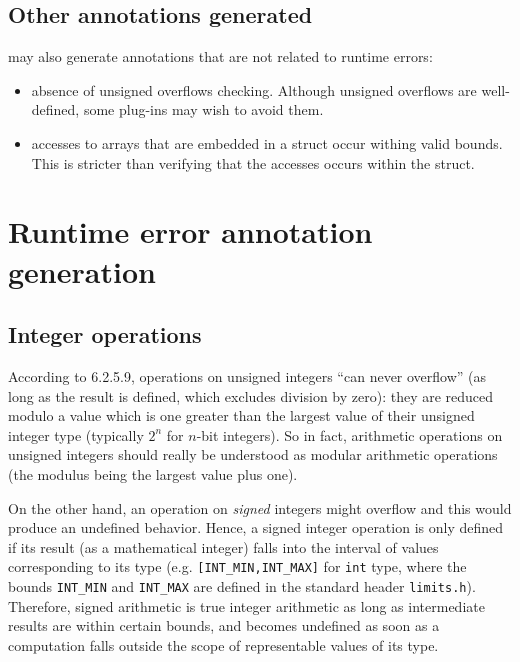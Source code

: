 \section{Other annotations generated}

\rte{} may also generate annotations that are not related to runtime errors:

\begin{itemize}

\item absence of unsigned overflows checking. Although unsigned overflows are
  well-defined, some plug-ins may wish to avoid them.

\item accesses to arrays that are embedded in a struct occur withing valid
  bounds. This is stricter than verifying that the accesses occurs within the
  struct.

\end{itemize}

\chapter{Runtime error annotation generation}

\section{Integer operations}

According to \mbox{6.2.5.9}, operations on unsigned integers ``can never
overflow'' (as long as the result is defined, which excludes division by zero):
they are reduced modulo a value which is one greater than the largest value of
their unsigned integer type (typically $2^n$ for $n$-bit integers).  So in fact,
arithmetic operations on unsigned integers should really be understood as
modular arithmetic operations (the modulus being the largest value plus one).

On the other hand, an operation on {\em signed} integers might overflow and this
would produce an undefined behavior.  Hence, a signed integer operation is only
defined if its result (as a mathematical integer) falls into the interval of
values corresponding to its type (e.g. \lstinline|[INT_MIN,INT_MAX]| for
\lstinline|int| type, where the bounds \lstinline|INT_MIN| and
\lstinline|INT_MAX| are defined in the standard header \lstinline|limits.h|).
Therefore, signed arithmetic is true integer arithmetic as long as intermediate
results are within certain bounds, and becomes undefined as soon as a
computation falls outside the scope of representable values of its type.

